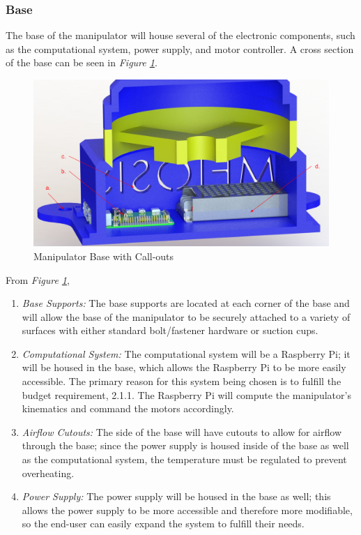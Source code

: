 \documentclass[12pt]{report}
\begin{document}
\subsubsection{Base}
The base of the manipulator will house several of the electronic components, such as the computational system, power supply, and motor controller. A cross section of the base can be seen in \emph{Figure \ref{fig:base}}.
\begin{figure}[htp]
  \centering
  \includegraphics[frame, width=.75\textwidth]{base_callouts}
  \caption{Manipulator Base with Call-outs}
  \label{fig:base}
\end{figure}

From \emph{Figure \ref{fig:base}},
\begin{enumerate}[label=\alph*.]
  \item \emph{Base Supports:}
  The base supports are located at each corner of the base and will allow the base of the manipulator to be securely attached to a variety of surfaces with either standard bolt/fastener hardware or suction cups.
  \item \emph{Computational System:}
  The computational system will be a Raspberry Pi; it will be housed in the base, which allows the Raspberry Pi to be more easily accessible. The primary reason for this system being chosen is to fulfill the budget requirement, 2.1.1. The Raspberry Pi will compute the manipulator's kinematics and command the motors accordingly.
  \item \emph{Airflow Cutouts:}
  The side of the base will have cutouts to allow for airflow through the base; since the power supply is housed inside of the base as well as the computational system, the temperature must be regulated to prevent overheating.
  \item \emph{Power Supply:}
  The power supply will be housed in the base as well; this allows the power supply to be more accessible and therefore more modifiable, so the end-user can easily expand the system to fulfill their needs.
\end{enumerate}
\newpage
\end{document}
